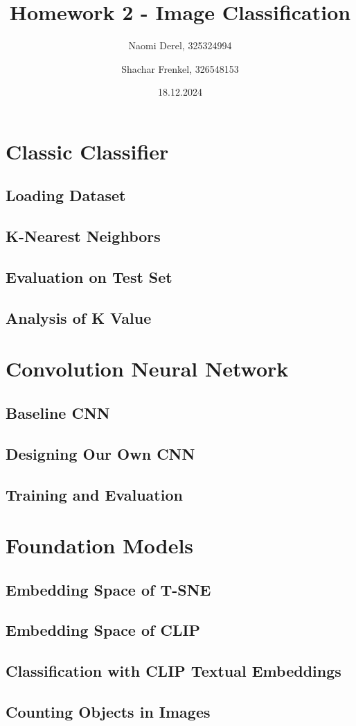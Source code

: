 \documentclass{article}
\title{Homework 2 - Image Classification}
\author{Naomi Derel, 325324994 
\and Shachar Frenkel, 326548153}
\date{18.12.2024}
\begin{document}
\maketitle

\section{Classic Classifier}

\subsection{Loading Dataset}

\subsection{K-Nearest Neighbors}

\subsection{Evaluation on Test Set}

\subsection{Analysis of K Value}

\section{Convolution Neural Network}

\subsection{Baseline CNN}

\subsection{Designing Our Own CNN}

\subsection{Training and Evaluation}

\section{Foundation Models}

\subsection{Embedding Space of T-SNE}

\subsection{Embedding Space of CLIP}

\subsection{Classification with CLIP Textual Embeddings}

\subsection{Counting Objects in Images}
\end{document}
